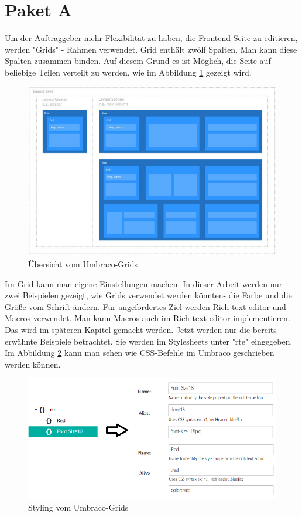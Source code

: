 \pagebreak
\section{Paket A}
Um der Auftraggeber mehr Flexibilität zu haben, die Frontend-Seite zu editieren, werden "Grids" - Rahmen verwendet. Grid enthält zwölf Spalten. Man kann diese Spalten zusammen binden. Auf diesem Grund es ist Möglich, die Seite auf beliebige Teilen verteilt zu werden, wie im Abbildung \ref{fig:GridsLayout} gezeigt wird.

\begin{figure}[h]
	\centering
	\includegraphics[width=1\linewidth]{Graphics/GridsLayout.png}
	\caption[GridsLayout]{Übersicht vom Umbraco-Grids}
	\label{fig:GridsLayout}
\end{figure}

 Im Grid kann man eigene Einstellungen machen. In dieser Arbeit werden nur zwei Beispielen gezeigt, wie Grids verwendet werden könnten- die Farbe und die Größe vom Schrift ändern. Für angefordertes Ziel werden Rich text editor und Macros verwendet. Man kann Macros auch im Rich text editor implementieren. Das wird im späteren Kapitel gemacht werden. Jetzt werden nur die bereits erwähnte Beispiele betrachtet. Sie werden im Stylesheets unter "rte" eingegeben. Im Abbildung \ref{fig:StylingGrind} kann man sehen wie CSS-Befehle im Umbraco geschrieben werden können.
     
     \begin{figure}[h]
     	\centering
     	\includegraphics[width=0.6\linewidth]{Graphics/StylingGrind.png}
     	\caption[StylingGrind]{Styling vom Umbraco-Grids}
     	\label{fig:StylingGrind}
     \end{figure}
     
